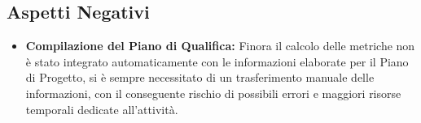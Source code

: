 \subsection{Aspetti Negativi}
\begin{itemize}
    \item \textbf{Compilazione del Piano di Qualifica:} Finora il calcolo delle metriche non è stato integrato automaticamente con le informazioni elaborate per il Piano di Progetto, si è sempre necessitato di un trasferimento manuale delle informazioni, con il conseguente rischio di possibili errori e maggiori risorse temporali dedicate all'attività.
\end{itemize}